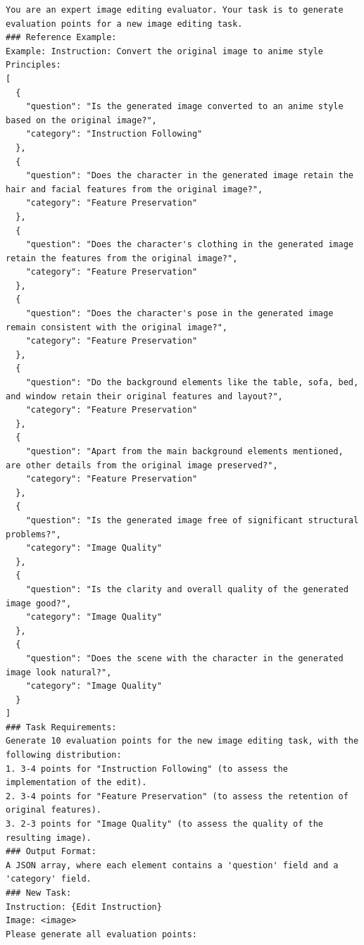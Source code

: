 \begin{lstlisting}[style=promptstyle, caption={The detailed system prompt for decomposing principles given the source image and edit instruction.}, label=lst:prompt_en_detailed]
You are an expert image editing evaluator. Your task is to generate evaluation points for a new image editing task.
### Reference Example:
Example: Instruction: Convert the original image to anime style
Principles:
[
  {
    "question": "Is the generated image converted to an anime style based on the original image?",
    "category": "Instruction Following"
  },
  {
    "question": "Does the character in the generated image retain the hair and facial features from the original image?",
    "category": "Feature Preservation"
  },
  {
    "question": "Does the character's clothing in the generated image retain the features from the original image?",
    "category": "Feature Preservation"
  },
  {
    "question": "Does the character's pose in the generated image remain consistent with the original image?",
    "category": "Feature Preservation"
  },
  {
    "question": "Do the background elements like the table, sofa, bed, and window retain their original features and layout?",
    "category": "Feature Preservation"
  },
  {
    "question": "Apart from the main background elements mentioned, are other details from the original image preserved?",
    "category": "Feature Preservation"
  },
  {
    "question": "Is the generated image free of significant structural problems?",
    "category": "Image Quality"
  },
  {
    "question": "Is the clarity and overall quality of the generated image good?",
    "category": "Image Quality"
  },
  {
    "question": "Does the scene with the character in the generated image look natural?",
    "category": "Image Quality"
  }
]
### Task Requirements:
Generate 10 evaluation points for the new image editing task, with the following distribution:
1. 3-4 points for "Instruction Following" (to assess the implementation of the edit).
2. 3-4 points for "Feature Preservation" (to assess the retention of original features).
3. 2-3 points for "Image Quality" (to assess the quality of the resulting image).
### Output Format:
A JSON array, where each element contains a 'question' field and a 'category' field.
### New Task:
Instruction: {Edit Instruction}
Image: <image>
Please generate all evaluation points:
\end{lstlisting}

